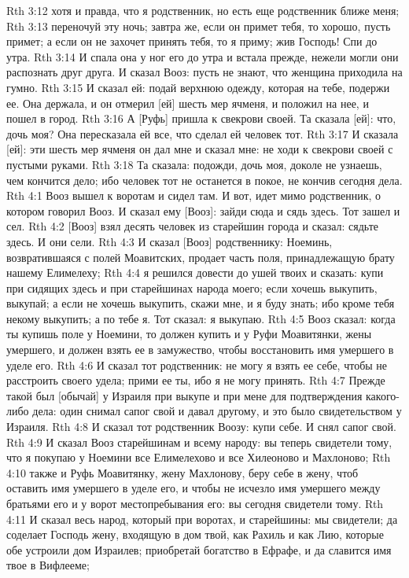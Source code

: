 Rth 3:12  хотя и правда, что я родственник, но есть еще родственник ближе меня;
Rth 3:13  переночуй эту ночь; завтра же, если он примет тебя, то хорошо, пусть примет; а если он не захочет принять тебя, то я приму; жив Господь! Спи до утра.
Rth 3:14  И спала она у ног его до утра и встала прежде, нежели могли они распознать друг друга. И сказал Вооз: пусть не знают, что женщина приходила на гумно.
Rth 3:15  И сказал ей: подай верхнюю одежду, которая на тебе, подержи ее. Она держала, и он отмерил [ей] шесть мер ячменя, и положил на нее, и пошел в город.
Rth 3:16  А [Руфь] пришла к свекрови своей. Та сказала [ей]: что, дочь моя? Она пересказала ей все, что сделал ей человек тот.
Rth 3:17  И сказала [ей]: эти шесть мер ячменя он дал мне и сказал мне: не ходи к свекрови своей с пустыми руками.
Rth 3:18  Та сказала: подожди, дочь моя, доколе не узнаешь, чем кончится дело; ибо человек тот не останется в покое, не кончив сегодня дела.
Rth 4:1  Вооз вышел к воротам и сидел там. И вот, идет мимо родственник, о котором говорил Вооз. И сказал ему [Вооз]: зайди сюда и сядь здесь. Тот зашел и сел.
Rth 4:2  [Вооз] взял десять человек из старейшин города и сказал: сядьте здесь. И они сели.
Rth 4:3  И сказал [Вооз] родственнику: Ноеминь, возвратившаяся с полей Моавитских, продает часть поля, принадлежащую брату нашему Елимелеху;
Rth 4:4  я решился довести до ушей твоих и сказать: купи при сидящих здесь и при старейшинах народа моего; если хочешь выкупить, выкупай; а если не хочешь выкупить, скажи мне, и я буду знать; ибо кроме тебя некому выкупить; а по тебе я. Тот сказал: я выкупаю.
Rth 4:5  Вооз сказал: когда ты купишь поле у Ноемини, то должен купить и у Руфи Моавитянки, жены умершего, и должен взять ее в замужество, чтобы восстановить имя умершего в уделе его.
Rth 4:6  И сказал тот родственник: не могу я взять ее себе, чтобы не расстроить своего удела; прими ее ты, ибо я не могу принять.
Rth 4:7  Прежде такой был [обычай] у Израиля при выкупе и при мене для подтверждения какого-либо дела: один снимал сапог свой и давал другому, и это было свидетельством у Израиля.
Rth 4:8  И сказал тот родственник Воозу: купи себе. И снял сапог свой.
Rth 4:9  И сказал Вооз старейшинам и всему народу: вы теперь свидетели тому, что я покупаю у Ноемини все Елимелехово и все Хилеоново и Махлоново;
Rth 4:10  также и Руфь Моавитянку, жену Махлонову, беру себе в жену, чтоб оставить имя умершего в уделе его, и чтобы не исчезло имя умершего между братьями его и у ворот местопребывания его: вы сегодня свидетели тому.
Rth 4:11  И сказал весь народ, который при воротах, и старейшины: мы свидетели; да соделает Господь жену, входящую в дом твой, как Рахиль и как Лию, которые обе устроили дом Израилев; приобретай богатство в Ефрафе, и да славится имя твое в Вифлееме;

